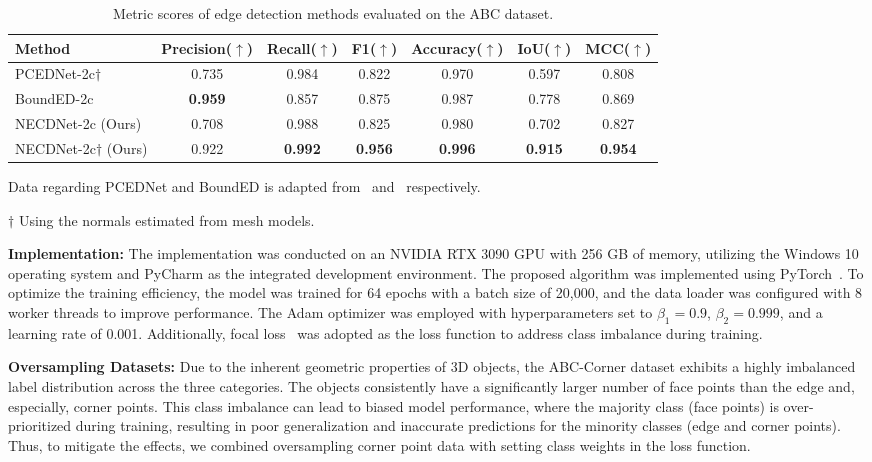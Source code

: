 \documentclass[lettersize,journal]{IEEEtran}
\begin{document}
\begin{table}[ht]
    \centering
    \small
    \begin{threeparttable}
    \setlength{\tabcolsep}{17pt}
    \caption{Metric scores of edge detection methods evaluated on the ABC dataset.}
    \label{tab:edge_result}
    \begin{tabular}{lcccccc}
        \toprule
        Method & Precision($\uparrow$) & Recall($\uparrow$) & F1($\uparrow$) & Accuracy($\uparrow$) & IoU($\uparrow$) & MCC($\uparrow$) \\
        \midrule
        PCEDNet-2c$\dagger$~\cite{himeur_pcednet_2022} & 0.735 & 0.984 & 0.822 & 0.970 & 0.597 & 0.808 \\
        BoundED-2c~\cite{bode_bounded_2023} & \textbf{0.959} & 0.857 & 0.875 & 0.987 & 0.778 & 0.869 \\
        NECDNet-2c (Ours) & 0.708 & 0.988 & 0.825 & 0.980 & 0.702 & 0.827 \\
        NECDNet-2c$\dagger$ (Ours) & 0.922 & \textbf{0.992} & \textbf{0.956} & \textbf{0.996} & \textbf{0.915} & \textbf{0.954} \\
        \bottomrule
    \end{tabular}
    \begin{tablenotes}
        \footnotesize
         Data regarding PCEDNet and BoundED is adapted from~\cite{himeur_pcednet_2022} and~\cite{bode_bounded_2023} respectively.
         
        $\dagger$ Using the normals estimated from mesh models. 
     \end{tablenotes}
     \end{threeparttable}
    
\end{table}

\textbf{Implementation: } 
The implementation was conducted on an NVIDIA RTX 3090 GPU with 256 GB of memory, utilizing the Windows 10 operating system and PyCharm as the integrated development environment. The proposed algorithm was implemented using PyTorch~\cite{paszke_pytorch_2019}. To optimize the training efficiency, the model was trained for 64 epochs with a batch size of 20,000, and the data loader was configured with 8 worker threads to improve performance. The Adam optimizer was employed with hyperparameters set to $\beta_1 = 0.9$, $\beta_2 = 0.999$, and a learning rate of 0.001. Additionally, focal loss~\cite{lin_focal_2020} was adopted as the loss function to address class imbalance during training.

\textbf{Oversampling Datasets: }
Due to the inherent geometric properties of 3D objects, the ABC-Corner dataset exhibits a highly imbalanced label distribution across the three categories. The objects consistently have a significantly larger number of face points than the edge and, especially, corner points. This class imbalance can lead to biased model performance, where the majority class (face points) is over-prioritized during training, resulting in poor generalization and inaccurate predictions for the minority classes (edge and corner points).
Thus, to mitigate the effects, we combined oversampling corner point data with setting class weights in the loss function.
\end{document}

